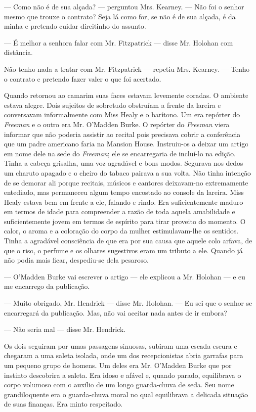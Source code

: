 --- Como não é de sua alçada? --- perguntou Mrs. Kearney. --- Não foi o
senhor mesmo que trouxe o contrato? Seja lá como for, se não é de sua
alçada, é da minha e pretendo cuidar direitinho do assunto.

--- É melhor a senhora falar com Mr. Fitzpatrick --- disse Mr. Holohan
com distância.

Não tenho nada a tratar com Mr. Fitzpatrick --- repetiu Mrs. Kearney.
--- Tenho o contrato e pretendo fazer valer o que foi acertado.

Quando retornou ao camarim suas faces estavam levemente coradas. O
ambiente estava alegre. Dois sujeitos de sobretudo obstruíam a frente
da lareira e conversavam informalmente com Miss Healy e o barítono.
Um era repórter do \textit{Freeman} e o outro era Mr. O'Madden Burke. O
repórter do \textit{Freeman} viera informar que não poderia assistir ao
recital pois precisava cobrir a conferência que um padre americano
faria na Mansion House. Instruiu-os a deixar um artigo em nome dele
na sede do \textit{Freeman}; ele se encarregaria de incluí-lo na edição.
Tinha a cabeça grisalha, uma voz agradável e bons modos. Segurava nos
dedos um charuto apagado e o cheiro do tabaco pairava a sua volta.
Não tinha intenção de se demorar ali porque recitais, músicos e
cantores deixavam-no extremamente entediado, mas permaneceu algum
tempo encostado ao console da lareira. Miss Healy estava bem em
frente a ele, falando e rindo. Era suficientemente maduro em termos de
idade para compreender a razão de toda aquela amabilidade e
suficientemente jovem em termos de espírito para tirar proveito do
momento. O calor, o aroma e a coloração do corpo da mulher
estimulavam-lhe os sentidos. Tinha a agradável consciência de que
era por sua causa que aquele colo arfava, de que o riso, o perfume e
os olhares sugestivos eram um tributo a ele. Quando já não podia mais
ficar, despediu-se dela pesaroso.

--- O'Madden Burke vai escrever o artigo --- ele explicou a Mr.
Holohan --- e eu me encarrego da publicação.

--- Muito obrigado, Mr. Hendrick --- disse Mr. Holohan. --- Eu sei
que o senhor se encarregará da publicação. Mas, não vai aceitar nada
antes de ir embora?

--- Não seria mal --- disse Mr. Hendrick.

Os dois seguiram por umas passagens sinuosas, subiram uma escada
escura e chegaram a uma saleta isolada, onde um dos recepcionistas
abria garrafas para um pequeno grupo de homens. Um deles era Mr.
O'Madden Burke que por instinto descobrira a
saleta. Era idoso e afável e, quando parado, equilibrava o corpo
volumoso com o auxílio de um longo guarda-chuva de seda. Seu nome
grandiloquente era o guarda-chuva moral no qual equilibrava a
delicada situação de suas finanças. Era minto respeitado.

